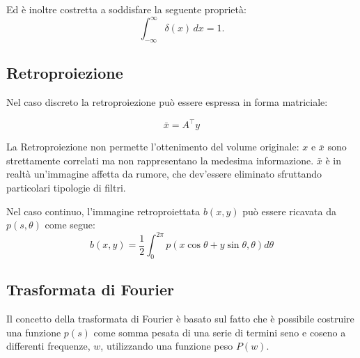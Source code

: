 \documentclass[a4paper,12pt, doubleside]{report}
\begin{document}
                    Ed è inoltre costretta a soddisfare la seguente proprietà:
                    \begin{equation}
                        \int_{-\infty}^\infty \delta(x) \, dx = 1.
                    \end{equation}
                                
            \subsection{Retroproiezione}
                \par
                    Nel caso discreto la retroproiezione può essere espressa in forma matriciale:
                    
                    \begin{equation}
                        \bar{x} = A^\top y
                    \end{equation}
                    
                    La Retroproiezione non permette l'ottenimento del volume originale: $x$ e $\bar{x}$ sono strettamente correlati ma non rappresentano la medesima informazione. $\bar{x}$ è in realtà un'immagine affetta da rumore, che dev'essere eliminato sfruttando particolari tipologie di filtri.
                
                \bigskip
                \par
                    Nel caso continuo, l'immagine retroproiettata $b(x,y)$ può essere ricavata da $p(s,\theta)$ come segue:
                    \begin{equation}
                        b(x,y) = \frac{1}{2} \int_{0}^{2\pi} p(x \cos \theta + y \sin \theta , \theta ) d\theta
                    \end{equation}
                
                \bigskip
                               
            \subsection{Trasformata di Fourier}
                \par
                    Il concetto della trasformata di Fourier è basato sul fatto che è possibile costruire una funzione $p(s)$ come somma pesata di una serie di termini seno e coseno a differenti frequenze, $w$, utilizzando una funzione peso $P(w)$.
                
\end{document}
